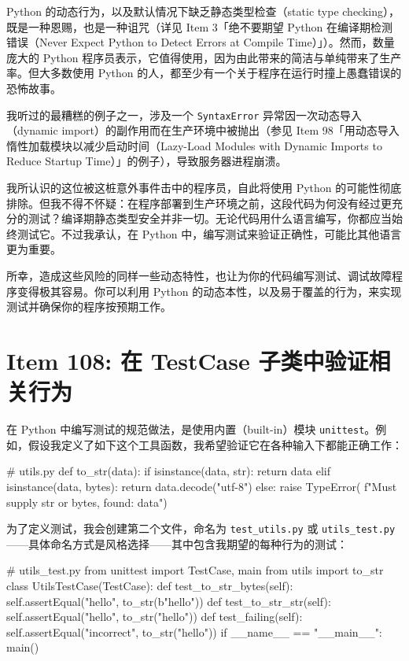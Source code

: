 Python 的动态行为，以及默认情况下缺乏静态类型检查（static type checking），既是一种恩赐，也是一种诅咒（详见 Item 3「绝不要期望 Python 在编译期检测错误（Never Expect Python to Detect Errors at Compile Time）」）。然而，数量庞大的 Python 程序员表示，它值得使用，因为由此带来的简洁与单纯带来了生产率。但大多数使用 Python 的人，都至少有一个关于程序在运行时撞上愚蠢错误的恐怖故事。

我听过的最糟糕的例子之一，涉及一个 \texttt{SyntaxError} 异常因一次动态导入（dynamic import）的副作用而在生产环境中被抛出（参见 Item 98「用动态导入惰性加载模块以减少启动时间（Lazy-Load Modules with Dynamic Imports to Reduce Startup Time）」的例子），导致服务器进程崩溃。

我所认识的这位被这桩意外事件击中的程序员，自此将使用 Python 的可能性彻底排除。但我不得不怀疑：在程序部署到生产环境之前，这段代码为何没有经过更充分的测试？编译期静态类型安全并非一切。无论代码用什么语言编写，你都应当始终测试它。不过我承认，在 Python 中，编写测试来验证正确性，可能比其他语言更为重要。

所幸，造成这些风险的同样一些动态特性，也让为你的代码编写测试、调试故障程序变得极其容易。你可以利用 Python 的动态本性，以及易于覆盖的行为，来实现测试并确保你的程序按预期工作。

\section{Item 108: 在 TestCase 子类中验证相关行为}

在 Python 中编写测试的规范做法，是使用内置（built-in）模块 \texttt{unittest}。例如，假设我定义了如下这个工具函数，我希望验证它在各种输入下都能正确工作：

\begin{codebox}[python]
# utils.py
def to_str(data):
    if isinstance(data, str):
        return data
    elif isinstance(data, bytes):
        return data.decode("utf-8")
    else:
         raise TypeError(
    f"Must supply str or bytes, found: {data}")
\end{codebox}

为了定义测试，我会创建第二个文件，命名为 \texttt{test\_utils.py} 或 \texttt{utils\_test.py}——具体命名方式是风格选择——其中包含我期望的每种行为的测试：

\begin{codebox}[python]
# utils_test.py
from unittest import TestCase, main
from utils import to_str
class UtilsTestCase(TestCase):
    def test_to_str_bytes(self):
        self.assertEqual("hello", to_str(b"hello"))
    def test_to_str_str(self):
        self.assertEqual("hello", to_str("hello"))
    def test_failing(self):
        self.assertEqual("incorrect", to_str("hello"))
if __name__ == "__main__":
    main()
\end{codebox}

